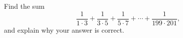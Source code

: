 Find the sum
\[\dfrac{1}{1\cdot3}+\dfrac{1}{3\cdot5}+\dfrac{1}{5\cdot7}+\cdots+\dfrac{1}{199\cdot201},\]
and explain why your answer is correct.
